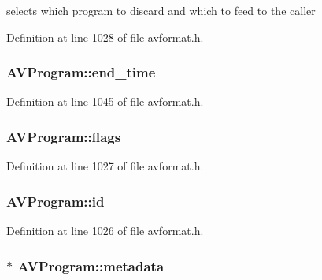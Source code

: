 selects which program to discard and which to feed to the caller 



Definition at line 1028 of file avformat.\+h.

\subsubsection[{\texorpdfstring{end\+\_\+time}{end_time}}]{ A\+V\+Program\+::end\+\_\+time}\hypertarget{struct_a_v_program_a5a7795c918153d0f64d68a838e172db4}{}\label{struct_a_v_program_a5a7795c918153d0f64d68a838e172db4}


Definition at line 1045 of file avformat.\+h.

\subsubsection[{\texorpdfstring{flags}{flags}}]{ A\+V\+Program\+::flags}\hypertarget{struct_a_v_program_a8c87564167b87f54be9171778d51fe49}{}\label{struct_a_v_program_a8c87564167b87f54be9171778d51fe49}


Definition at line 1027 of file avformat.\+h.

\subsubsection[{\texorpdfstring{id}{id}}]{ A\+V\+Program\+::id}\hypertarget{struct_a_v_program_a10cc799a98b37335e820b0bdb386eb95}{}\label{struct_a_v_program_a10cc799a98b37335e820b0bdb386eb95}


Definition at line 1026 of file avformat.\+h.

\subsubsection[{\texorpdfstring{metadata}{metadata}}]{$\ast$ A\+V\+Program\+::metadata}\hypertarget{struct_a_v_program_ae9dab38d4694e3da9cba0f882f4e43d3}{}\label{struct_a_v_program_ae9dab38d4694e3da9cba0f882f4e43d3}


